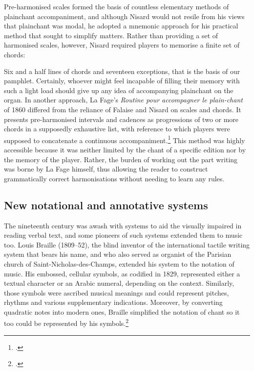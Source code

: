 Pre-harmonised scales formed the basis of countless elementary methods of plainchant accompaniment, and although Nisard would not resile from his views that plainchant was modal, he adopted a mnemonic approach for his practical method that sought to simplify matters.
Rather than providing a set of harmonised scales, however, Nisard required players to memorise a finite set of chords:

  {\cite[41]{Nisardaccompagnementplainchantorgue1860}}
{Six and a half lines of chords and seventeen exceptions, that is the basis of our pamphlet. Certainly, whoever might feel incapable of filling their memory with such a light load should give up any idea of accompanying plainchant on the organ.}
\noindent{}%
In another approach, La Fage's \textit{Routine pour accompagner le plain-chant} of 1860 differed from the reliance of Falaise and Nisard on scales and chords.
It presents pre-harmonised intervals and cadences as progressions of two or more chords in a supposedly exhaustive list, with reference to which players were supposed to concatenate a continuous accompaniment.\footcite[5--6]{LaFageRoutinepouraccompagner1860}
This method was highly accessible because it was neither limited by the chant of a specific edition nor by the memory of the player.
Rather, the burden of working out the part writing was borne by La Fage himself, thus allowing the reader to construct grammatically correct harmonisations without needing to learn any rules.

\subsection{New notational and annotative systems}
The nineteenth century was awash with systems to aid the visually impaired in reading verbal text, and some pioneers of such systems extended them to music too.
Louis Braille (1809--52), the blind inventor of the international tactile writing system that bears his name, and who also served as organist of the Parisian church of Saint-Nicholas-des-Champs, extended his system to the notation of music.
His embossed, cellular symbols, as codified in 1829, represented either a textual character or an Arabic numeral, depending on the context.
Similarly, those symbols were ascribed musical meanings and could represent pitches, rhythms and various supplementary indications.
Moreover, by converting quadratic notes into modern ones, Braille simplified the notation of chant so it too could be represented by his symbols.\footcite[18--20]{BrailleProcedepourecrire1829}

